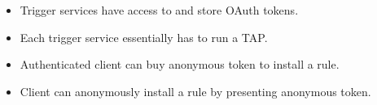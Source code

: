 \begin{itemize}
  \item Trigger services have access to and store OAuth tokens.
  \item Each trigger service essentially has to run a TAP.
\end{itemize}

\begin{itemize}
  \item Authenticated client can buy anonymous token to install a rule.
  \item Client can anonymously install a rule by presenting anonymous
    token. 
\end{itemize}
